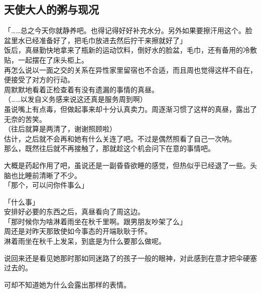 \subsection{天使大人的粥与现况}

「……总之今天你就静养吧。也得记得好好补充水分。另外如果要擦汗用这个。脸盆里水已经准备好了，把毛巾放进去然后拧干来擦就好了」\\

饭后，真昼勤快地拿来了瓶新的运动饮料，倒好水的脸盆，毛巾，还有备用的冷敷贴，一起摆在了床头柜上。\\

再怎么说以一面之交的关系在异性家里留宿也不合适，而且周也觉得这样不自在，便接受了对方的行动。\\

周默默地看着正检查着有没有遗漏的事情的真昼。\\

（……以发自义务感来说这还真是服务周到啊）\\

虽说嘴上有点毒，但做起事来却十分认真卖力。周逐渐习惯了这样的真昼，露出了无奈的苦笑。\\

（往后就算是两清了，谢谢照顾啦）\\

估计，之后就不会再和她有什么关连了吧。不过是偶然照看了自己一次呐。\\

那么，既然往后就不再接触了，那就趁这个机会问下在意的事情吧。

大概是药起作用了吧，虽说还是一副昏昏欲睡的感觉，但热似乎已经退了一些。头脑也比睡前清晰了不少。\\

「那个，可以问你件事么」

「什么事」\\

安排好必要的东西之后，真昼看向了周这边。\\

「那时候你为啥淋着雨坐在秋千里啊。跟男朋友吵架了么」\\

周还是对昨天那致使如今事态的开端耿耿于怀。\\

淋着雨坐在秋千上发呆，到底是为什么要那么做呢。

说回来还是看见她那时那如同迷路了的孩子一般的眼神，对此感到在意才把伞硬塞过去的。

可却不知道她为什么会露出那样的表情。\\

